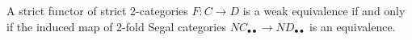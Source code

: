 \documentclass{amsart}
\begin{document}
\begin{lemma}[\cite{MR2366560}] \label{lma:2catnervereflectsequiv}
	A strict functor of strict 2-categories $F: C \to D$ is a weak equivalence if and only if the induced map of 2-fold Segal categories $NC_{\bullet \bullet} \to ND_{\bullet \bullet}$ is an equivalence. 
\end{lemma}

\end{document}
